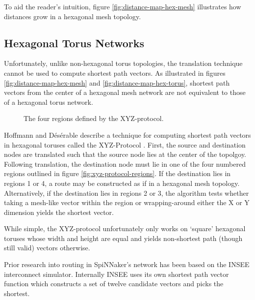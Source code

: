			To aid the reader's intuition, figure \ref{fig:distance-map-hex-mesh}
			illustrates how distances grow in a hexagonal mesh topology.
		
		\subsection{Hexagonal Torus Networks}
			
			Unfortunately, unlike non-hexagonal torus topologies, the translation
			technique cannot be used to compute shortest path vectors. As illustrated
			in figures \ref{fig:distance-map-hex-mesh} and
			\ref{fig:distance-map-hex-torus}, shortest path vectors from the center
			of a hexagonal mesh network are not equivalent to those of a hexagonal
			torus network.
			
			\begin{figure}
				\center
				
				\caption{The four regions defined by the XYZ-protocol.}
				\label{fig:xyz-protocol-regions-figure}
			\end{figure}
			
			Hoffmann and D\'es\'erable describe a technique for computing shortest
			path vectors in hexagonal toruses called the XYZ-Protocol
			\cite{hoffmann15,hoffmann11}. First, the source and destination nodes are
			translated such that the source node lies at the center of the topolgoy.
			Following translation, the destination node must lie in one of the four
			numbered  regions outlined in figure \ref{fig:xyz-protocol-regions}.  If
			the destination lies in regions 1 or 4, a route may be constructed as if
			in a hexagonal mesh topology. Alternatively, if the destination lies in
			regions 2 or 3, the algorithm tests whether taking a mesh-like vector
			within the region or wrapping-around either the X or Y dimension yields
			the shortest vector.
			
			While simple, the XYZ-protocol unfortunately only works on `square'
			hexagonal toruses whose width and height are equal and yields
			non-shortest path (though still valid) vectors otherwise.
			
			Prior research into routing in SpiNNaker's network has been based on the
			INSEE \cite{navaridas09,ghasempour15} interconnect simulator. Internally
			INSEE uses its own shortest path vector function which constructs a set
			of twelve candidate vectors and picks the shortest.
			
